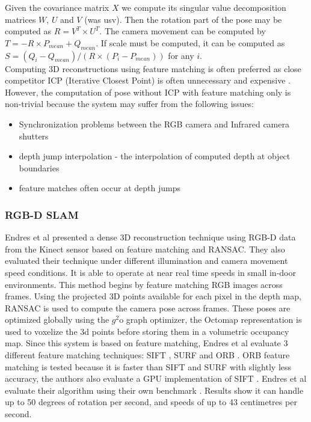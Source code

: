 Given the covariance matrix $X$ we compute its singular value decomposition matrices $W$, $U$ and $V$ (was usv). Then the rotation part of the pose may be computed as $R = V^T \times U^T$. The camera movement can be computed by $T = -R \times P_{mean} + Q_{mean}$. If scale must be computed, it can be computed as $S = (Q_i - Q_{mean}) / (R \times(P_i - P_{mean}))$ for any $i$. \\

Computing 3D reconstructions using feature matching is often preferred as close competitor ICP (Iterative Closest Point) is often unnecessary and expensive \cite{Endres12Evaluation}. However, the computation of pose without ICP with feature matching only is non-trivial because the system may suffer from the following issues:


\begin{itemize}
\item Synchronization problems between the RGB camera and Infrared camera shutters
\item depth jump interpolation - the interpolation of computed depth at object boundaries
\item feature matches often occur at depth jumps
\end{itemize}



\subsubsection{RGB-D SLAM}

Endres et al \cite{Endres12Evaluation} presented a dense 3D reconstruction technique using RGB-D data from the Kinect sensor based on feature matching and RANSAC. They also evaluated their technique under different illumination and camera movement speed conditions. It is able to operate at near real time speeds in small in-door environments. This method begins by feature matching RGB images across frames. Using the projected 3D points available for each pixel in the depth map, RANSAC \cite{Fischler81Random,Huttenlocher91Fast} is used to compute the camera pose across frames. These poses are optimized globally using the $g^2$o graph optimizer, the Octomap representation \cite{Wurm10Octomap} is used to voxelize the 3d points before storing them in a volumetric occupancy map. Since this system is based on feature matching, Endres et al evaluate 3 different feature matching techniques: SIFT \cite{Lowe04Distinctive} , SURF \cite{Bay06Surf,Bay08Speeded} and ORB \cite{Rublee11Orb}. ORB feature matching is tested because it is faster than SIFT and SURF with slightly less accuracy, the authors also evaluate a GPU implementation of SIFT \cite{Wu07Siftgpu}. Endres et al evaluate their algorithm using their own benchmark \cite{Sturm11Towards}. Results show it can handle up to 50 degrees of rotation per second, and speeds of up to 43 centimetres per second.  \\


